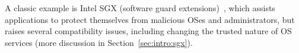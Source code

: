 A classic example %
is Intel SGX (software guard extensions)~\cite{intelsgx},
which assists applications to protect themselves from malicious OSes and administrators,
but raises several compatibility issues,
including changing the trusted nature of OS services (more discussion in Section~\ref{sec:intro:sgx}).








\begin{comment}
Take the Linux support of huge pages (pages larger than 4KB) for example.
Linux implements a transparent mechanism to convert contiguous 4KB pages to huge pages, in order to keep \syscall{mmap} compatible with existing applications.
The transparent conversion increases paging latency 
and has fragmentation and fairness issues~\cite{kwon16ingens}.
Linux also introduces a new flag \code{MAP\_HUGETLB} for \syscall{mmap}, as an incompatible but more effective way to allocating huge pages.
Overall, OS developers face a dilemma between preserving the compatibility for existing applications and extending system interfaces for abstracting new hardware.
The development effort of preserving the compatibility may be too expensive,
or violate the performance or threat models of certain native applications, making the transparent approach no longer an option.
Because updating all application against the new system interfaces
can be time-consuming,
OS developers should not delay and let the perfect be the the enemy of the good.
\end{comment}

